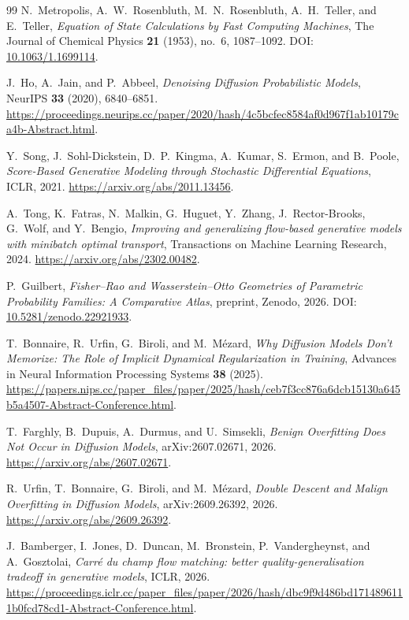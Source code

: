 \documentclass[11pt,reqno,a4paper]{amsart}
\theoremstyle{plain}
\theoremstyle{definition}
\theoremstyle{remark}
\begin{document}
\begin{thebibliography}{99}
N.~Metropolis, A.~W.~Rosenbluth, M.~N.~Rosenbluth, A.~H.~Teller,
and E.~Teller,
\emph{Equation of State Calculations by Fast Computing Machines},
The Journal of Chemical Physics \textbf{21} (1953), no.~6, 1087--1092.
\newblock DOI: \href{https://doi.org/10.1063/1.1699114}{10.1063/1.1699114}.

J.~Ho, A.~Jain, and P.~Abbeel,
\emph{Denoising Diffusion Probabilistic Models},
NeurIPS \textbf{33} (2020), 6840--6851.
\url{https://proceedings.neurips.cc/paper/2020/hash/4c5bcfec8584af0d967f1ab10179ca4b-Abstract.html}.

Y.~Song, J.~Sohl-Dickstein, D.~P.~Kingma, A.~Kumar, S.~Ermon,
and B.~Poole,
\emph{Score-Based Generative Modeling through Stochastic Differential Equations},
ICLR, 2021.
\url{https://arxiv.org/abs/2011.13456}.

A.~Tong, K.~Fatras, N.~Malkin, G.~Huguet, Y.~Zhang,
J.~Rector-Brooks, G.~Wolf, and Y.~Bengio,
\emph{Improving and generalizing flow-based generative models with minibatch optimal transport},
Transactions on Machine Learning Research, 2024.
\url{https://arxiv.org/abs/2302.00482}.

P.~Guilbert,
\emph{Fisher--Rao and Wasserstein--Otto Geometries of Parametric Probability Families: A Comparative Atlas},
preprint, Zenodo, 2026.
\newblock DOI: \href{https://doi.org/10.5281/zenodo.22921933}{10.5281/zenodo.22921933}.



T.~Bonnaire, R.~Urfin, G.~Biroli, and M.~M\'ezard,
\emph{Why Diffusion Models Don't Memorize: The Role of Implicit Dynamical Regularization in Training},
Advances in Neural Information Processing Systems \textbf{38} (2025).
\url{https://papers.nips.cc/paper_files/paper/2025/hash/ceb7f3cc876a6dcb15130a645b5a4507-Abstract-Conference.html}.

T.~Farghly, B.~Dupuis, A.~Durmus, and U.~Simsekli,
\emph{Benign Overfitting Does Not Occur in Diffusion Models},
arXiv:2607.02671, 2026.
\url{https://arxiv.org/abs/2607.02671}.

R.~Urfin, T.~Bonnaire, G.~Biroli, and M.~M\'ezard,
\emph{Double Descent and Malign Overfitting in Diffusion Models},
arXiv:2609.26392, 2026.
\url{https://arxiv.org/abs/2609.26392}.

J.~Bamberger, I.~Jones, D.~Duncan, M.~Bronstein,
P.~Vandergheynst, and A.~Gosztolai,
\emph{Carr\'e du champ flow matching: better quality-generalisation tradeoff in generative models},
ICLR, 2026.
\url{https://proceedings.iclr.cc/paper_files/paper/2026/hash/dbc9f9d486bd1714896111b0fcd78cd1-Abstract-Conference.html}.


\end{thebibliography}
\end{document}
